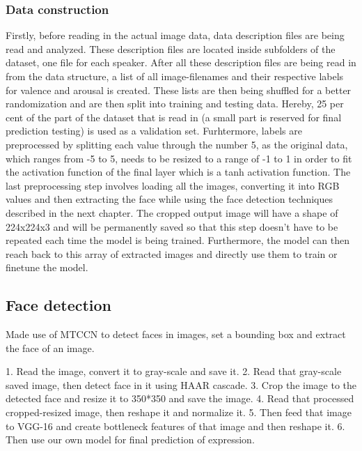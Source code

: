 \subsubsection{Data construction}
Firstly, before reading in the actual image data, data description files are being read and analyzed. These description files are located inside subfolders of the dataset, one file for each speaker.
After all these description files are being read in from the data structure, a list of all image-filenames and their respective labels for valence and arousal is created.
\newline\newline
These lists are then being shuffled for a better randomization and are then split into training and testing data. Hereby, 25 per cent of the part of the dataset that is read in (a small part is reserved for final prediction testing) is used as a validation set.
\newline\newline
Furhtermore, labels are preprocessed by splitting each value through the number 5, as the original data, which ranges from -5 to 5, needs to be resized to a range of -1 to 1 in order to fit the activation function of the final layer which is a tanh activation function.
\newline\newline
The last preprocessing step involves loading all the images, converting it into RGB values and then extracting the face while using the face detection techniques described in the next chapter. The cropped output image will have a shape of 224x224x3 and will be permanently saved so that this step doesn't have to be repeated each time the model is being trained. Furthermore, the model can then reach back to this array of extracted images and directly use them to train or finetune the model.


\subsection{Face detection}
Made use of MTCCN to detect faces in images, set a bounding box and extract the face of an image.\cite{Zhang:2016:MTCCN}

1. Read the image, convert it to gray-scale and save it.
2. Read that gray-scale saved image, then detect face in it using HAAR cascade.
3. Crop the image to the detected face and resize it to 350*350 and save the image.
4. Read that processed cropped-resized image, then reshape it and normalize it.
5. Then feed that image to VGG-16 and create bottleneck features of that image and then reshape it.
6. Then use our own model for final prediction of expression.\cite{Sharma:2018:RealTimeFacialExpression}

